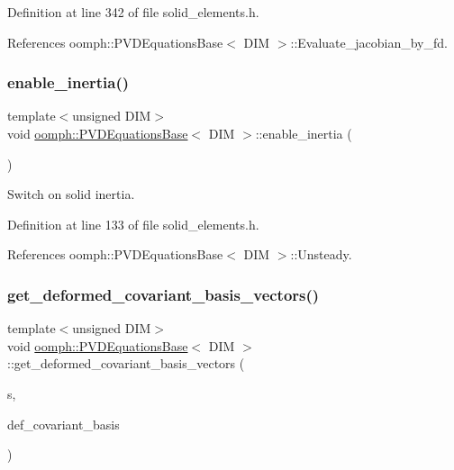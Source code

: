 Definition at line 342 of file solid\+\_\+elements.\+h.



References oomph\+::\+P\+V\+D\+Equations\+Base$<$ D\+I\+M $>$\+::\+Evaluate\+\_\+jacobian\+\_\+by\+\_\+fd.

\mbox{\label{classoomph_1_1PVDEquationsBase_af4c1805ff3722f048e9c4ab3380f8838}} 
\subsubsection{\texorpdfstring{enable\+\_\+inertia()}{enable\_inertia()}}
{\footnotesize\ttfamily template$<$unsigned D\+IM$>$ \\
void \hyperlink{classoomph_1_1PVDEquationsBase}{oomph\+::\+P\+V\+D\+Equations\+Base}$<$ D\+IM $>$\+::enable\+\_\+inertia (\begin{DoxyParamCaption}{ }\end{DoxyParamCaption})\hspace{0.3cm}{\ttfamily [inline]}}



Switch on solid inertia. 



Definition at line 133 of file solid\+\_\+elements.\+h.



References oomph\+::\+P\+V\+D\+Equations\+Base$<$ D\+I\+M $>$\+::\+Unsteady.

\mbox{\label{classoomph_1_1PVDEquationsBase_a8b8ea33a48438f2414e28651b5b28a0f}} 
\subsubsection{\texorpdfstring{get\+\_\+deformed\+\_\+covariant\+\_\+basis\+\_\+vectors()}{get\_deformed\_covariant\_basis\_vectors()}}
{\footnotesize\ttfamily template$<$unsigned D\+IM$>$ \\
void \hyperlink{classoomph_1_1PVDEquationsBase}{oomph\+::\+P\+V\+D\+Equations\+Base}$<$ D\+IM $>$\+::get\+\_\+deformed\+\_\+covariant\+\_\+basis\+\_\+vectors (\begin{DoxyParamCaption}\item[{const \hyperlink{classoomph_1_1Vector}{Vector}$<$ double $>$ \&}]{s,  }\item[{\hyperlink{classoomph_1_1DenseMatrix}{Dense\+Matrix}$<$ double $>$ \&}]{def\+\_\+covariant\+\_\+basis }\end{DoxyParamCaption})}



